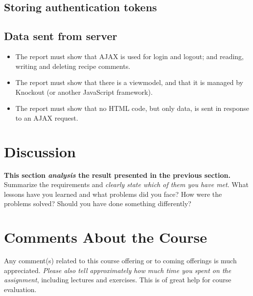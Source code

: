 \documentclass[a4paper]{scrartcl}
\begin{document}
\subsection{Storing authentication tokens}


\subsection{Data sent from server}



\begin{itemize}
	\item The report must show that AJAX is used for login and logout; and reading, writing and deleting recipe comments.
	\item The report must show that there is a viewmodel, and that it is managed by Knockout (or another JavaScript framework).
	\item The report must show that no HTML code, but only data, is sent in response to an AJAX request.
\end{itemize}

\section{Discussion}

\textbf{This section \textit{analysis} the result presented in the previous section.} \\

\noindent Summarize the requirements and \textit{clearly state which of them you have met}. What lessons have you learned and what problems did you face? How were the problems solved? Should you have done something differently?

\section{Comments About the Course}

Any comment(s) related to this course offering or to coming offerings is much appreciated. \textit{Please also tell approximately how much time you spent on the assignment}, including lectures and exercises. This is of great help for course evaluation.
\end{document}
